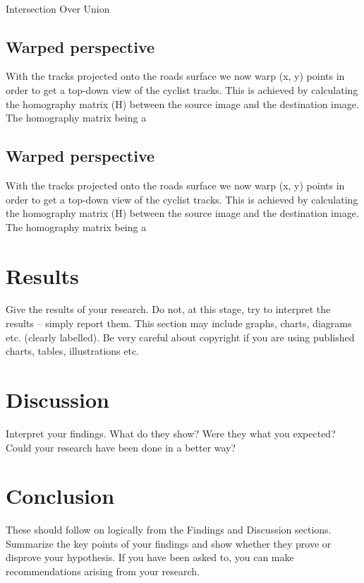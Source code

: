 \documentclass[10pt, a4paper, twocolumn]{article} %
\begin{document}
\ \\
Intersection Over Union

\subsection{Warped perspective}

With the tracks projected onto the roads surface we now warp (x, y) points in order to get a top-down view of the cyclist tracks.
This is achieved by calculating the homography matrix (H) between the source image and the destination image. The homography matrix being a 

\subsection{Warped perspective}
With the tracks projected onto the roads surface we now warp (x, y) points in order to get a top-down view of the cyclist tracks.
This is achieved by calculating the homography matrix (H) between the source image and the destination image. The homography matrix being a 

\section{Results}

Give the results of your research. Do not, at this stage, try to interpret the results – simply report them. 
This section may include graphs, charts, diagrams etc. (clearly labelled). Be very careful about copyright if you are using published charts, tables, illustrations etc.


\section{Discussion}

Interpret your findings. What do they show? Were they what you expected? 
Could your research have been done in a better way?

\section{Conclusion}

These should follow on logically from the Findings and Discussion sections. Summarize the key points of your findings and show whether they prove or disprove your hypothesis. 
If you have been asked to, you can make recommendations arising from your research.


\printbibliography[title={Bibliography}] %


\end{document}
